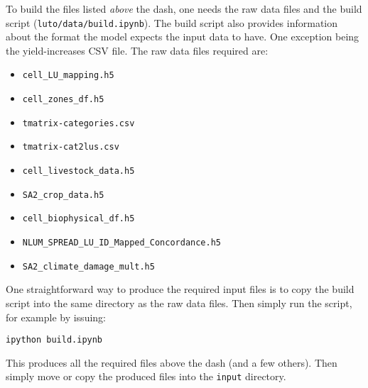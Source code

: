 \documentclass[12pt,a4paper,twoside]{article}
\begin{document}
To build the files listed \emph{above} the dash, one needs the raw data files and the build script (\texttt{luto/data/build.ipynb}). The build script also provides information about the format the model expects the input data to have. One exception being the yield-increases CSV file. The raw data files required are:
\begin{itemize}
\setlength{\itemsep}{0pt}\setlength{\parskip}{0pt}\setlength{\itemindent}{-.3cm}
	\item \texttt{cell_LU_mapping.h5}
	\item \texttt{cell_zones_df.h5}
	\item \texttt{tmatrix-categories.csv}
	\item \texttt{tmatrix-cat2lus.csv}
	\item \texttt{cell_livestock_data.h5}
	\item \texttt{SA2_crop_data.h5}
	\item \texttt{cell_biophysical_df.h5}
	\item \texttt{NLUM_SPREAD_LU_ID_Mapped_Concordance.h5}
	\item \texttt{SA2_climate_damage_mult.h5}
\end{itemize}
One straightforward way to produce the required input files is to copy the build script into the same directory as the raw data files. Then simply run the script, for example by issuing:

\begin{verbatim}
ipython build.ipynb
\end{verbatim}
This produces all the required files above the dash (and a few others). Then simply move or copy the produced files into the \texttt{input} directory.
\end{document}
